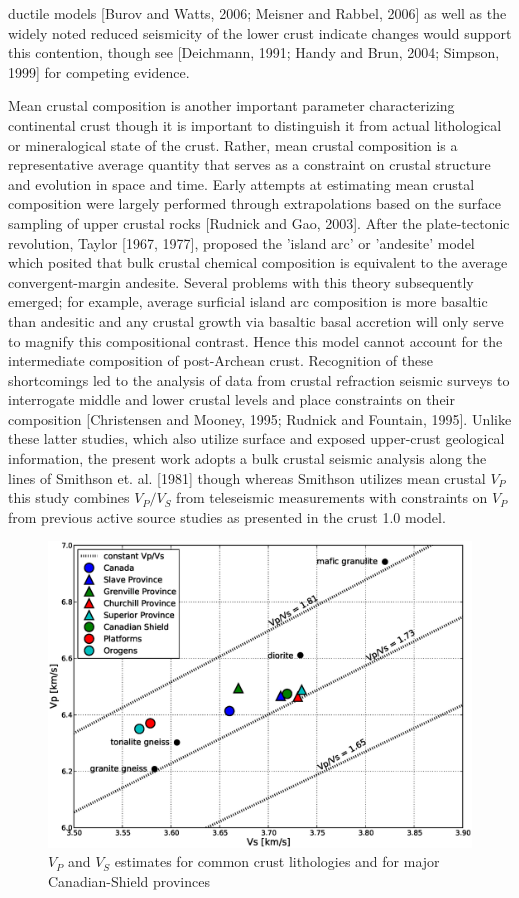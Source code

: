 \documentclass[draft, 12pt]{article}
\begin{document}
ductile models [Burov and Watts, 2006; Meisner and Rabbel, 2006] as well as the widely noted reduced seismicity of the lower crust indicate changes would support this contention, though see [Deichmann, 1991; Handy and Brun, 2004; Simpson, 1999] for competing evidence.

Mean crustal composition is another important parameter characterizing continental crust though it is important to distinguish it from actual lithological or mineralogical state of the crust. Rather, mean crustal composition is a representative average quantity that serves as a constraint on crustal structure and evolution in space and time. Early attempts at estimating mean crustal composition were largely performed through extrapolations based on the surface sampling of upper crustal rocks [Rudnick and Gao, 2003]. After the plate-tectonic revolution, Taylor [1967, 1977], proposed the 'island arc' or 'andesite' model which posited that bulk crustal chemical composition is equivalent to the average convergent-margin andesite. Several problems with this theory subsequently emerged; for example, average surficial island arc composition is more basaltic than andesitic and any crustal growth via basaltic basal accretion will only serve to magnify this compositional contrast. Hence this model cannot account for the intermediate composition of post-Archean crust. Recognition of these shortcomings led to the analysis of data from crustal refraction seismic surveys to interrogate middle and lower crustal levels and place constraints on their composition [Christensen and Mooney, 1995; Rudnick and Fountain, 1995]. Unlike these latter studies, which also utilize surface and exposed upper-crust geological information, the present work adopts a bulk crustal seismic analysis along the lines of Smithson et. al. [1981] though whereas Smithson utilizes mean crustal $V_P$ this study combines $V_P/V_S$ from teleseismic measurements with constraints on $V_P$ from previous active source studies as presented in the crust 1.0 model.

\begin{figure}
  \centering
  \includegraphics[width=\textwidth]{lithology}
  \caption{$V_P$ and $V_S$ estimates for common crust lithologies and for major Canadian-Shield provinces}
  \label{fig:lith}
\end{figure}
\end{document}
